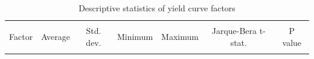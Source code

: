 \documentclass[12pt,bibliography=totoc]{article}
\begin{document}
\begin{table}[H]
\caption{Descriptive statistics of yield curve factors}%
\fontsize{10}{10}\selectfont
\centering %
\begin{tabular}{l c c c c c c}%
\hline\hline   \\ [-1.5ex]               %
Factor & Average & Std. dev. & Minimum & Maximum & Jarque-Bera t-stat.  & P value \\ [0.5ex] %

\hline       \\ [-1.5ex]           %


\end{tabular}
\end{table}
\end{document}

